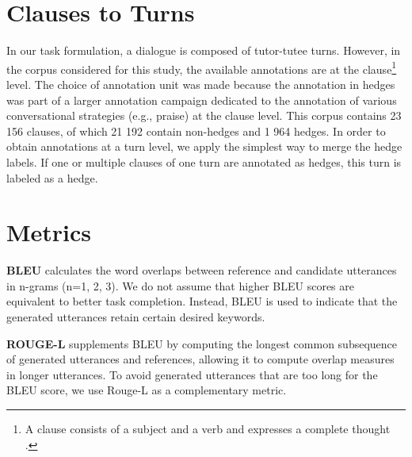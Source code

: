 \documentclass[11pt]{article}
\begin{document}



\appendix

\section{Clauses to Turns} \label{clause_2_turn}


In our task formulation, a dialogue is composed of tutor-tutee turns. However, in the corpus considered for this study, the available annotations are at the clause\footnote{A clause consists of a subject and a verb and expresses a complete thought \citep{berry2010identifying}.} level. The choice of annotation unit was made because the annotation in hedges was part of a larger annotation campaign dedicated to the annotation of various conversational strategies (e.g., praise) at the clause level. This corpus contains 23 156 clauses, of which 21 192 contain non-hedges and 1 964 hedges. In order to obtain annotations at a turn level, we apply the simplest way to merge the hedge labels. If one or multiple clauses of one turn are annotated as hedges, this turn is labeled as a hedge.




\section{Metrics} \label{appendix:metrics}

\textbf{BLEU} \citep{papineni2002bleu} calculates the word overlaps between reference and candidate utterances in n-grams (n=1, 2, 3).  We do not assume that higher BLEU scores are equivalent to better task completion. Instead, BLEU is used to indicate that the generated utterances retain certain desired keywords. 

\textbf{ROUGE-L} \citep{lin2004rouge} supplements BLEU by computing the longest common subsequence of generated utterances and references, allowing it to compute overlap measures in longer utterances. To avoid generated utterances that are too long for the BLEU score, we use Rouge-L as a complementary metric.
\end{document}
